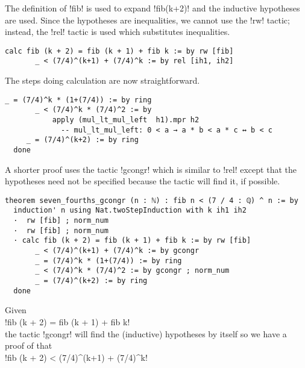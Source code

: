 The definition of !fib! is used to expand !fib(k+2)! and the inductive hypotheses are used. Since the hypotheses are inequalities, we cannot use the !rw! tactic; instead, the !rel! tactic is used which substitutes inequalities.
\begin{Verbatim}[firstnumber=last]
    calc fib (k + 2) = fib (k + 1) + fib k := by rw [fib]
       _ < (7/4)^(k+1) + (7/4)^k := by rel [ih1, ih2]
\end{Verbatim}
The steps doing calculation are now straightforward.
\begin{Verbatim}[firstnumber=last]
       _ = (7/4)^k * (1+(7/4)) := by ring
       _ < (7/4)^k * (7/4)^2 := by
           apply (mul_lt_mul_left  h1).mpr h2
             -- mul_lt_mul_left: 0 < a → a * b < a * c ↔ b < c
     _ = (7/4)^(k+2) := by ring
  done
\end{Verbatim}



A shorter proof uses the tactic !gcongr! which is similar to !rel! except that the hypotheses need not be specified because the tactic will find it, if possible.
\begin{Verbatim}
theorem seven_fourths_gcongr (n : ℕ) : fib n < (7 / 4 : ℚ) ^ n := by
  induction' n using Nat.twoStepInduction with k ih1 ih2
  ·  rw [fib] ; norm_num
  ·  rw [fib] ; norm_num
  · calc fib (k + 2) = fib (k + 1) + fib k := by rw [fib]
       _ < (7/4)^(k+1) + (7/4)^k := by gcongr
       _ = (7/4)^k * (1+(7/4)) := by ring
       _ < (7/4)^k * (7/4)^2 := by gcongr ; norm_num
       _ = (7/4)^(k+2) := by ring
  done
\end{Verbatim}
Given\\
\indnt{}!fib (k + 2) = fib (k + 1) + fib k!\\
the tactic !gcongr! will find the (inductive) hypotheses by itself so we have a proof of that\\
\indnt{}!fib (k + 2) < (7/4)^(k+1) + (7/4)^k!

